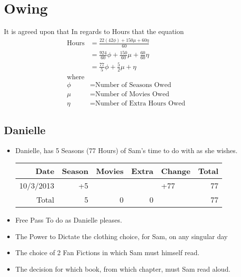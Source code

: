 

 

 \section{Owing}
 It is agreed upon that In regards to Hours that the equation
 \large
 \begin{align}
 \text{Hours} &= \frac{22(42\phi)+150\mu + 60\eta}{60}\\
 &= \frac{924}{60}\phi + \frac{150}{60}\mu + \frac{60}{60}\eta\\
 &= \frac{77}{5}\phi + \frac{5}{2}\mu + \eta\\\nonumber
  \text{where}\\ \nonumber
 \phi &=  \text{Number of Seasons Owed}\\\nonumber
 \mu &=  \text{Number of Movies Owed}\\\nonumber
 \eta &=  \text{Number of Extra Hours Owed}
 \end{align}
 
 

  
 \normalsize
 \subsection{Danielle}

 \begin{itemize}
   \item Danielle, has 5 Seasons (77 Hours) of Sam's time to do with as she wishes.\\
    \begin{tabular}{r|rrr|l|r}
 		Date&Season&Movies&Extra&Change&Total\\
 		\hline
 		10/3/2013&+5&&&+77& 77\\
 		\hline
 		\hline
 		Total&5&0&0&&77
 	\end{tabular}
   \item Free Pass To do as Danielle pleases.
   \item The Power to Dictate the clothing choice, for Sam, on any singular day
   \item The choice of 2 Fan Fictions in which Sam must himself read.
   \item The decision for which book, from which chapter, must Sam read aloud.
 \end{itemize} 


 

